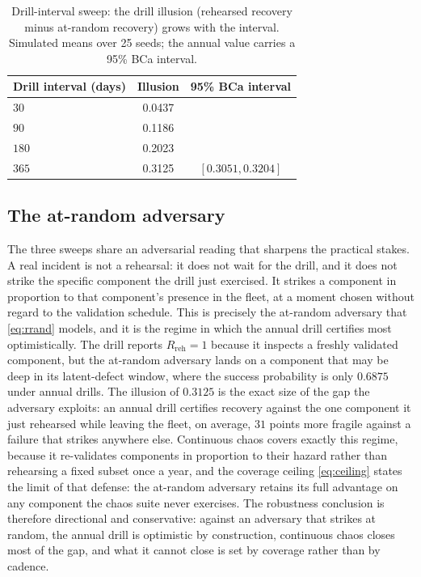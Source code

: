 \documentclass[journal]{IEEEtran}
\begin{document}
\begin{table}[t]
\centering
\caption{Drill-interval sweep: the drill illusion (rehearsed recovery minus at-random recovery) grows
with the interval. Simulated means over 25 seeds; the annual value carries a 95\% BCa interval.}
\label{tab:int_sweep}
\footnotesize
\setlength{\tabcolsep}{6pt}
\begin{tabular}{@{}lcc@{}}
\toprule
Drill interval (days) & Illusion & 95\% BCa interval \\
\midrule
$30$  & 0.0437 & \\
$90$  & 0.1186 & \\
$180$ & 0.2023 & \\
$365$ & 0.3125 & $[0.3051, 0.3204]$ \\
\bottomrule
\end{tabular}
\end{table}

\subsection{The at-random adversary}
The three sweeps share an adversarial reading that sharpens the practical stakes. A real incident is
not a rehearsal: it does not wait for the drill, and it does not strike the specific component the
drill just exercised. It strikes a component in proportion to that component's presence in the fleet,
at a moment chosen without regard to the validation schedule. This is precisely the at-random
adversary that \eqref{eq:rrand} models, and it is the regime in which the annual drill certifies most
optimistically. The drill reports $R_{\mathrm{reh}} = 1$ because it inspects a freshly validated
component, but the at-random adversary lands on a component that may be deep in its latent-defect
window, where the success probability is only $0.6875$ under annual drills. The illusion of $0.3125$
is the exact size of the gap the adversary exploits: an annual drill certifies recovery against the
one component it just rehearsed while leaving the fleet, on average, $31$ points more fragile against
a failure that strikes anywhere else. Continuous chaos covers exactly this regime, because it
re-validates components in proportion to their hazard rather than rehearsing a fixed subset once a
year, and the coverage ceiling \eqref{eq:ceiling} states the limit of that defense: the at-random
adversary retains its full advantage on any component the chaos suite never exercises. The robustness
conclusion is therefore directional and conservative: against an adversary that strikes at random, the
annual drill is optimistic by construction, continuous chaos closes most of the gap, and what it
cannot close is set by coverage rather than by cadence.
\end{document}
